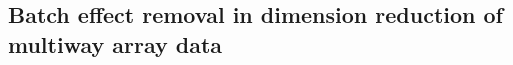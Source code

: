 \documentclass[simplex.tex]{subfiles}
\begin{document}
\subsection{Batch effect removal in dimension reduction of multiway array data}
%
%
%
%
%
%
\end{document}
